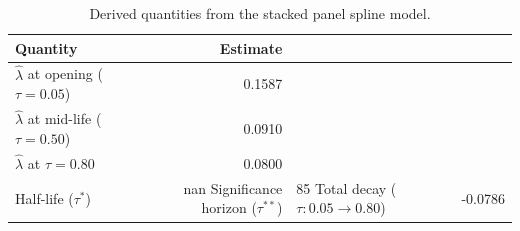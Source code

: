 \begin{table}[H]
\centering
\small
\caption{Derived quantities from the stacked panel spline model.}
\label{tab:derived}
\begin{tabular}{lr}
\toprule
Quantity & Estimate \\
\midrule
$\hat{\lambda}$ at opening ($\tau = 0.05$) & 0.1587 \\
$\hat{\lambda}$ at mid-life ($\tau = 0.50$) & 0.0910 \\
$\hat{\lambda}$ at $\tau = 0.80$ & 0.0800 \\
Half-life ($\tau^*$) & nan%
Significance horizon ($\tau^{**}$) & 85%
Total decay ($\tau: 0.05 \to 0.80$) & -0.0786 \\
\bottomrule
\end{tabular}
\end{table}